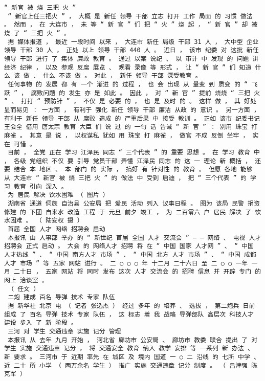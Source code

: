 \documentclass{article}
\begin{document}
\begin{Verbatim}[commandchars=\\\{\}]
 “ 新官 被 烧 三把 火 ” 
 “ 新官上任三把火 ” ， 大概 是 新任 领导 干部 立志 打开 工作 局面 的 习惯 做法 。 然而 ， 在 大连市 ， 未 等 “ 新 官 ” 们 把 “ 火 ” 烧 起 ， “ 新 官 ” 却 被 烧 了 “ 三把 火 ” 。 
 据 媒体报道 ， 最近 一段时间 以来 ， 大连市 新任 局级 干部 31 人 ， 大中型 企业 领导 干部 30 人 ， 正处 以上 领导 干部 440 人 。 近日 ， 该市 纪委 对 这批 新任 领导 干部 进行 了 集体 廉政 教育 。 通过 以案 说纪 、 以 审计 中 发现 的 问题 讲 经济 纪律 ， 以及 参观 反腐 展览 、 观看 录像 等 形式 ， 让 “ 新 官 ” 们 知道 什么 该 做 、 什么 不该 做 。 对此 ， 新任 领导 干部 深受教育 。 
 任何事物 的 发展 都 有 一个 渐进 的 过程 ， 也 会 出现 从 量变 到 质变 的 “ 飞跃 ” ， 腐败问题 的 发生 亦 是 如此 。 因此 ， 对 “ 新 官 ” 提前 烧烧 “ 三把 火 ” 、 打打 “ 预防针 ” ， 不仅 是 必要 的 ， 也 是 及时 的 。 这样 做 ， 其 好处 显而易见 ： 一方面 ， 有利于 强化 新任 领导 干部 廉洁 从政 的 意识 。 另一方面 ， 有利于 新任 领导 干部 从 腐败 造成 的 严重后果 中 接受 教训 。 正如 该市 纪委书记 王会全 借用 唐太宗 教育 大臣 们 说 过 的 一句 话 告诫 “ 新 官 ” ： 别用 珠宝 打 麻雀 。 其意 是 说 ， 以权谋私 犹如 用 珠宝 打 麻雀 ， 做官 不成 反倒 坐牢 ， 实在 可惜 。 
 目前 ， 全党 正在 学习 江泽民 同志 “ 三个代表 ” 的 重要 思想 。 在 学习 教育 中 ， 各级 党组织 不仅 要 引导 党员干部 弄懂 江泽民 同志 的 这 一 理论 新 概括 ， 还要 结合 本 地区 、 本 部门 的 实际 ， 搞好 有 针对性 的 教育 。 但愿 各地 能够 从 大连市 “ 新官 被 烧 三把 火 ” 的 做法 中 受到 启迪 ， 把 “ 三个代表 ” 的 学习 教育 引向 深入 。 
 为 居民 解决 饮水困难 （ 图片 ） 
 湖南省 通道 侗族 自治县 公安局 把 爱民 活动 列入 议事日程 。 图为 该局 民警 捐资 修建 的 下团 自来水 改造 工程 于 元旦 前夕 竣工 ， 为 二百零六 户 居民 解决 了 饮水困难 。 （ 陆安权 摄 ） 
 首届 全国 人才 网络 招聘会 启动 
 本报讯 由 人事部 举办 的 “ 新世纪 首届 全国 人才 交流会 ” — — 网络 、 电视 人才 招聘会 正式 启动 。 大会 的 网络人才 招聘 将 在 “ 中国 国家 人才网 ” 、 “ 中国 人才热线 ” 、 “ 中国 南方人才 市场 ” 、 “ 中国 北方 人才 市场 ” 、 “ 中国 成都 人才 市场 ” 等 五家 网站 进行 。 二 ○ ○ ○ 年 十二月 二十六日 至 二 ○ ○ 一年 一月 二十日 ， 五家 网站 将 同时 发布 这次 人才 交流会 的 招聘 信息 并 开辟 专门 的 网上 洽谈室 。 
 （ 任文 ） 
 二炮 建成 百名 导弹 技术 专家 队伍 
 据 新华社 北京 电 （ 记者 张选杰 ） 经过 多年 的 培养 、 选拔 ， 第二炮兵 日前 组成 了 百名 导弹 技术 专家 队伍 ， 这 标志 着 我 战略 导弹部队 高层次 科技人才 建设 步入 了 新 阶段 。 
 三河 对 学生 交通违章 实施 记分 管理 
 本报讯 从 去年 九月 开始 ， 河北省 廊坊市 公安局 、 廊坊市 教委 联合 提出 了 对 学生 实施 交通违章 记分 ， 将 交通安全 教育 纳入 教学 安排 等 一系列 新 办法 、 新 要求 。 三河市 于 近期 率先 在 城区 及 境内 国道 一 ○ 二 沿线 的 七所 中学 、 近 二十 所 小学 （ 两万余名 学生 ） 推广 实施 交通违章 记分 制度 。 （ 吕津强 陈克军 ） 

\end{Verbatim}
\end{document}
